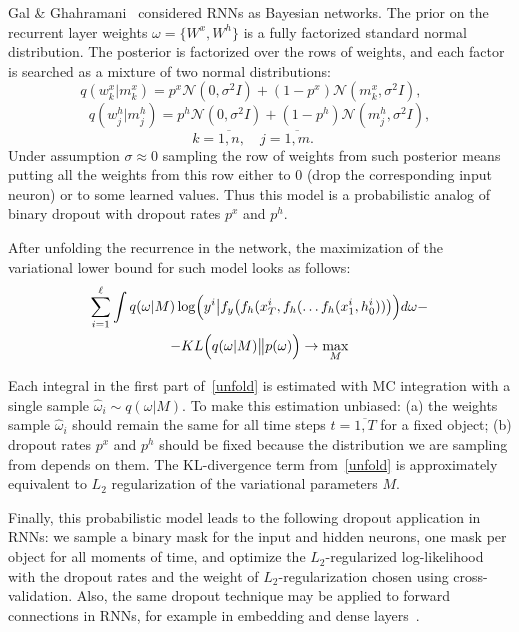 \documentclass{article}
\begin{document}
Gal \& Ghahramani~ considered RNNs as Bayesian networks. The prior on the recurrent layer weights $\omega=\{W^x, W^h\}$ is a fully factorized standard normal distribution. The posterior is factorized over the rows of weights, and each factor is searched as a mixture of two normal distributions:
\begin{equation*}
q(w^x_k|m^x_k) = p^x \mathcal{N}(0, \sigma^2 I) + (1-p^x) \mathcal{N}(m^x_k, \sigma^2 I),\quad\:
\end{equation*}
\begin{equation}
q(w^h_j|m^h_j) = p^h \mathcal{N}(0, \sigma^2 I) + (1-p^h) \mathcal{N}(m^h_j, \sigma^2 I),
\end{equation}
\begin{equation*}
k=\overline{1,n}, \quad j=\overline{1,m}.\quad
\end{equation*}
Under assumption $\sigma\approx 0$ sampling the row of weights from such posterior means putting all the weights from this row either to 0 (drop the corresponding input neuron) or to some learned values. Thus this model is a probabilistic analog of binary dropout with dropout rates $p^x$ and $p^h$.

After unfolding the recurrence in the network, the maximization of the variational lower bound for such model looks as follows:
\begin{gather}
\sum_{i=1}^\ell \int q(\omega|M) \log \Bigl(y^i\big|f_y\bigl(f_h(x^i_T, f_h(\dots f_h (x^i_1, h^i_0))\bigr)\Bigr) d \omega - \notag \\
-KL\Bigl(q(\omega|M)\big\|p(\omega)\Bigr) \rightarrow \max_{M} 
\label{unfold}
\end{gather}

Each integral in the first part of~\eqref{unfold} is estimated with MC integration with a single sample $\hat \omega_i \sim q(\omega|M)$.
To make this estimation unbiased: (a) the weights sample $\hat \omega_i$ should remain the same for all time steps $t=\overline{1, T}$ for a fixed object; (b) dropout rates $p^x$ and $p^h$ should be fixed because the distribution we are sampling from depends on them.
The KL-divergence term from~\eqref{unfold} is approximately equivalent to  $L_2$ regularization of the variational parameters $M$.

Finally, this probabilistic model leads to the following dropout application in RNNs: we sample a binary mask for the input and hidden neurons, one mask per object for all moments of time, and optimize the $L_2$-regularized log-likelihood with the dropout rates and the weight of $L_2$-regularization chosen using cross-validation. Also, the same dropout technique may be applied to forward connections in RNNs, for example in embedding and dense layers~\cite{gal}. 
\end{document}
